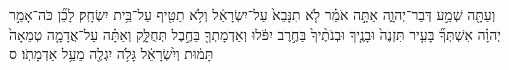 \documentclass{openreader}
\begin{document}
וְעַתָּ֖ה שְׁמַ֣ע דְּבַר־יְהוָ֑ה אַתָּ֣ה אֹמֵ֗ר לֹ֤א תִנָּבֵא֙ עַל־יִשְׂרָאֵ֔ל וְלֹ֥א תַטִּ֖יף עַל־בֵּ֥ית יִשְׂחָֽק׃ 
לָכֵ֞ן כֹּה־אָמַ֣ר יְהוָ֗ה אִשְׁתְּךָ֞ בָּעִ֤יר תִּזְנֶה֙ וּבָנֶ֤יךָ וּבְנֹתֶ֨יךָ֙ בַּחֶ֣רֶב יִפֹּ֔לוּ וְאַדְמָתְךָ֖ בַּחֶ֣בֶל תְּחֻלָּ֑ק וְאַתָּ֗ה עַל־אֲדָמָ֤ה טְמֵאָה֙ תָּמ֔וּת וְיִ֨שְׂרָאֵ֔ל גָּלֹ֥ה יִגְלֶ֖ה מֵעַ֥ל אַדְמָתֹֽו׃ ס 
\end{document}
